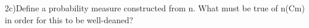 2c)Define a probability measure  constructed from n. What must be true of n(Cm) in
order for this to be well-deaned?







